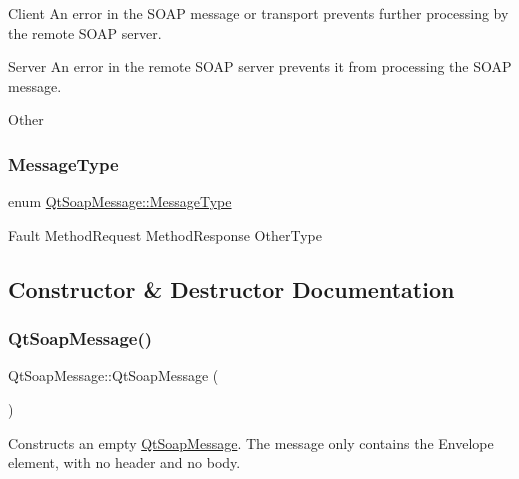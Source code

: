 Client An error in the S\+O\+AP message or transport prevents further processing by the remote S\+O\+AP server.

Server An error in the remote S\+O\+AP server prevents it from processing the S\+O\+AP message.

Other \mbox{\label{class_qt_soap_message_a57326237655d076b289452ce9ab3b8de}} 
\subsubsection{\texorpdfstring{Message\+Type}{MessageType}}
{\footnotesize\ttfamily enum \mbox{\hyperlink{class_qt_soap_message_a57326237655d076b289452ce9ab3b8de}{Qt\+Soap\+Message\+::\+Message\+Type}}\hspace{0.3cm}{\ttfamily [protected]}}

Fault  Method\+Request  Method\+Response  Other\+Type 

\subsection{Constructor \& Destructor Documentation}
\mbox{\label{class_qt_soap_message_ac3bdd2fcf2cf21e519a0b33862c2cf59}} 
\subsubsection{\texorpdfstring{Qt\+Soap\+Message()}{QtSoapMessage()}\hspace{0.1cm}{\footnotesize\ttfamily [1/2]}}
{\footnotesize\ttfamily Qt\+Soap\+Message\+::\+Qt\+Soap\+Message (\begin{DoxyParamCaption}{ }\end{DoxyParamCaption})}

Constructs an empty \mbox{\hyperlink{class_qt_soap_message}{Qt\+Soap\+Message}}. The message only contains the Envelope element, with no header and no body. \mbox{\label{class_qt_soap_message_a1e060067d5ddcef2bf25899f70d1713a}} 
